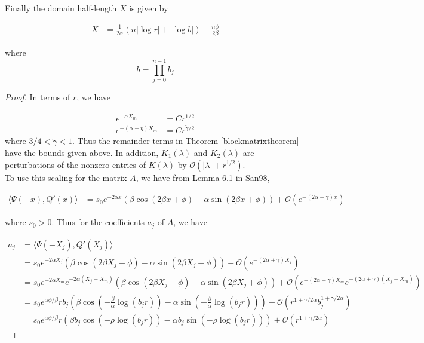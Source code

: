 \documentclass[thesis.tex]{subfiles}
\begin{document}
\begin{lemma}
Finally the domain half-length $X$ is given by

\begin{align}\label{Xscaled}
X &= \frac{1}{2\alpha} (n |\log r| + |\log b| ) - \frac{n \phi}{2 \beta}
\end{align}

where 
\begin{equation}\label{defb}
b = \prod_{j=0}^{n-1} b_j
\end{equation}

\begin{proof}
In terms of $r$, we have

\begin{align*}
e^{-\alpha X_m} &= C r^{1/2} \\
e^{-(\alpha - \eta) X_m} &= C r^{\tilde{\gamma}/2}
\end{align*}
where $3/4 < \tilde{\gamma} < 1$. Thus the remainder terms in Theorem \ref{blockmatrixtheorem} have the bounds given above. In addition, $K_1(\lambda)$ and $K_2(\lambda)$ are perturbations of the nonzero entries of $K(\lambda)$ by $\mathcal{O}(|\lambda| + r^{1/2})$.\\

To use this scaling for the matrix $A$, we have from Lemma 6.1 in San98,

\begin{align}
\langle \Psi(-x), Q'(x) \rangle
&= s_0 e^{-2 \alpha x}\left( \beta \cos(2 \beta x + \phi) - \alpha \sin(2 \beta x + \phi)\right) + \mathcal{O}(e^{-(2 \alpha + \gamma) x}) \label{IPpsiQprime}
\end{align}

where $s_0 > 0$. Thus for the coefficients $a_j$ of $A$, we have

\begin{align*}
a_j &= \langle \Psi(-X_j), Q'(X_j) \rangle \\
&= s_0 e^{-2 \alpha X_j}\left( \beta \cos(2 \beta X_j + \phi) - \alpha \sin(2 \beta X_j + \phi)\right) + \mathcal{O}(e^{-(2 \alpha + \gamma) X_j}) \\
&= s_0 e^{-2 \alpha X_m} e^{-2 \alpha (X_j - X_m)} \left( \beta \cos(2 \beta X_j + \phi) - \alpha \sin(2 \beta X_j + \phi)\right) + \mathcal{O}(e^{-(2 \alpha + \gamma) X_m} e^{-(2 \alpha + \gamma) (X_j - X_m) }) \\
&= s_0 e^{\alpha \phi/\beta} r b_j \left( \beta \cos\left( -\frac{\beta}{\alpha} \log(b_j r) \right) - \alpha \sin \left( -\frac{\beta}{\alpha} \log(b_j r) \right) \right) + \mathcal{O}(r^{1+\gamma/2\alpha} b_j^{1 + \gamma/2\alpha}) \\
&= s_0 e^{\alpha \phi/\beta} r \left( \beta b_j \cos\left( -\rho \log(b_j r) \right) - \alpha b_j \sin \left( -\rho \log(b_j r) \right) \right) + \mathcal{O}(r^{1+\gamma/2\alpha})
\end{align*}


\end{proof}
\end{lemma}
\end{document}
